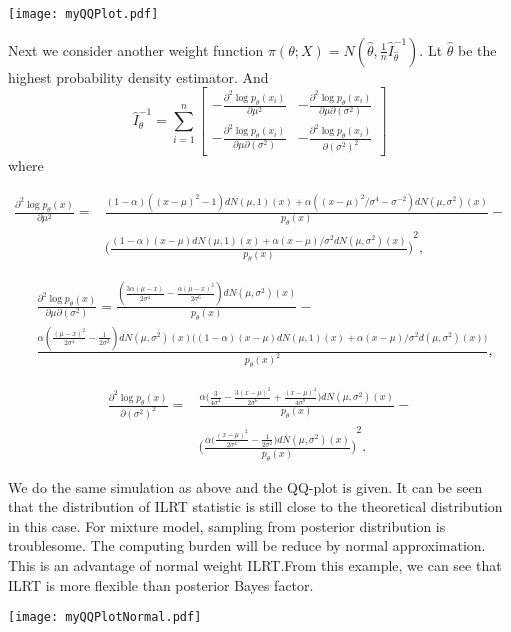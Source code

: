 \texttt{[image: myQQPlot.pdf]}


Next we consider another weight function $\pi (\theta; X)= N(\hat{\theta},\frac{1}{n}\hat{I}^{-1}_{\hat{\theta}})$. Lt $\hat{\theta}$ be the highest probability density estimator. And 
$$\hat{I}_\theta^{-1}=\sum_{i=1}^n
\begin{bmatrix}
-\frac{\partial^2 \log p_\theta(x_i)}{\partial \mu^2}&
    -\frac{\partial^2 \log p_\theta(x_i)}{\partial \mu\partial (\sigma^2)}
\\
    -\frac{\partial^2 \log p_\theta(x_i)}{\partial \mu\partial (\sigma^2)}
    &
    -\frac{\partial^2 \log p_\theta(x_i)}{\partial {(\sigma^2)}^2}
\end{bmatrix}$$
where

\begin{equation}
    \begin{aligned}
\frac{\partial^2 \log p_\theta(x)}{\partial
        \mu^2}=&
        \frac{(1-\alpha)({(x-\mu)}^2-1)dN(\mu,1)(x)+\alpha ({(x-\mu)}^2/\sigma^4 -\sigma^{-2})dN(\mu,\sigma^2)(x)}{p_\theta (x)}-\\
        &
        {\Big(\frac{(1-\alpha)(x-\mu)dN(\mu,1)(x)+\alpha(x-\mu)/\sigma^2 dN(\mu,\sigma^2)(x)}{p_\theta(x)}\Big)}^2,
    \end{aligned}
\end{equation}

\begin{equation}
    \begin{aligned}
        &\frac{\partial^2 \log p_\theta(x)}{\partial
        \mu\partial(\sigma^2)}=
        \frac{(\frac{3\alpha(\mu-x)}{2\sigma^4}-\frac{\alpha {(\mu-x)}^3}{2\sigma^6})dN(\mu,\sigma^2)(x)}{p_\theta (x)}-\\
        &
        \frac{\alpha (\frac{{(\mu-x)}^2}{2\sigma^4}-\frac{1}{2\sigma^2})dN(\mu,\sigma^2)(x)\big((1-\alpha)(x-\mu)dN(\mu,1)(x)+\alpha(x-\mu)/\sigma^2 d(\mu,\sigma^2)(x)\big)}{p_{\theta}{(x)}^2},
    \end{aligned}
\end{equation}


\begin{equation}
    \begin{aligned}
\frac{\partial^2 \log p_\theta(x)}{\partial
        {(\sigma^2)}^2}=&
        \frac{\alpha \big(\frac{3}{4\sigma^4}-\frac{3{(x-\mu)}^2}{2\sigma^6} +\frac{{(x-\mu)}^4}{4\sigma^8}\big)dN(\mu,\sigma^2)(x)}{p_\theta (x)}-\\
        &
        {\Big(\frac{\alpha\big(\frac{{(x-\mu)}^2}{2\sigma^4}-\frac{1}{2\sigma^2} \big)dN(\mu,\sigma^2)(x)}{p_\theta(x)}\Big)}^2.
    \end{aligned}
\end{equation}

We do the same simulation as above and the QQ-plot is given.
It  can be seen that the distribution of ILRT statistic is still close to the theoretical distribution in this case.
For mixture model, sampling from posterior distribution is troublesome.
The computing burden will be reduce by normal approximation.
This is an advantage of normal weight ILRT.\@ From this example, we can see that ILRT is more flexible than posterior Bayes factor.


\texttt{[image: myQQPlotNormal.pdf]}
